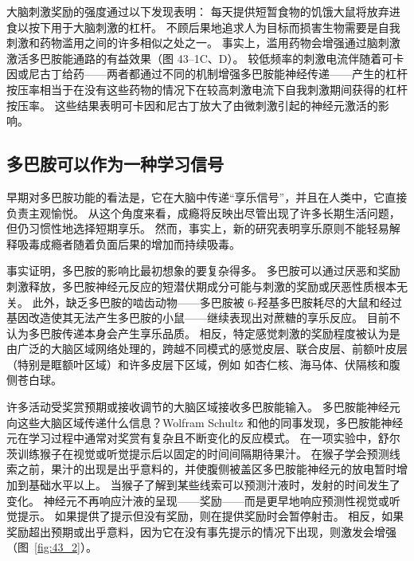 大脑刺激奖励的强度通过以下发现表明：
每天提供短暂食物的饥饿大鼠将放弃进食以按下用于大脑刺激的杠杆。
不顾后果地追求人为目标而损害生物需要是自我刺激和药物滥用之间的许多相似之处之一。
事实上，滥用药物会增强通过脑刺激激活多巴胺能通路的有益效果（图 43–1C、D）。
较低频率的刺激电流伴随着可卡因或尼古丁给药——两者都通过不同的机制增强多巴胺能神经传递——产生的杠杆按压率相当于在没有这些药物的情况下在较高刺激电流下自我刺激期间获得的杠杆按压率。
这些结果表明可卡因和尼古丁放大了由微刺激引起的神经元激活的影响。



\subsection{多巴胺可以作为一种学习信号}

早期对多巴胺功能的看法是，它在大脑中传递“享乐信号”，并且在人类中，它直接负责主观愉悦。
从这个角度来看，成瘾将反映出尽管出现了许多长期生活问题，但仍习惯性地选择短期享乐。
然而，事实上，新的研究表明享乐原则不能轻易解释吸毒成瘾者随着负面后果的增加而持续吸毒。


事实证明，多巴胺的影响比最初想象的要复杂得多。
多巴胺可以通过厌恶和奖励刺激释放，多巴胺神经元反应的短潜伏期成分可能与刺激的奖励或厌恶性质根本无关。
此外，缺乏多巴胺的啮齿动物——多巴胺被 6-羟基多巴胺耗尽的大鼠和经过基因改造使其无法产生多巴胺的小鼠——继续表现出对蔗糖的享乐反应。
目前不认为多巴胺传递本身会产生享乐品质。
相反，特定感觉刺激的奖励程度被认为是由广泛的大脑区域网络处理的，跨越不同模式的感觉皮层、联合皮层、前额叶皮层（特别是眶额叶区域）和许多皮层下区域，例如 如杏仁核、海马体、伏隔核和腹侧苍白球。


许多活动受奖赏预期或接收调节的大脑区域接收多巴胺能输入。
多巴胺能神经元向这些大脑区域传递什么信息？Wolfram Schultz 和他的同事发现，多巴胺能神经元在学习过程中通常对奖赏有复杂且不断变化的反应模式。
在一项实验中，舒尔茨训练猴子在视觉或听觉提示后以固定的时间间隔期待果汁。
在猴子学会预测线索之前，果汁的出现是出乎意料的，并使腹侧被盖区多巴胺能神经元的放电暂时增加到基础水平以上。
当猴子了解到某些线索可以预测汁液时，发射的时间发生了变化。
神经元不再响应汁液的呈现——奖励——而是更早地响应预测性视觉或听觉提示。
如果提供了提示但没有奖励，则在提供奖励时会暂停射击。
相反，如果奖励超出预期或出乎意料，因为它在没有事先提示的情况下出现，则激发会增强（图~\ref{fig:43_2}）。


